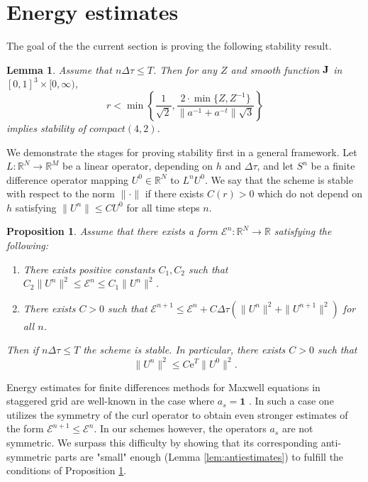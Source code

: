 \documentclass[12pt,reqno]{amsart}
\newcommand{\R}{\mathbb{R}}
\newcommand{\h}{{\bf H}}
\newcommand{\J}{{\bf J}}
\newtheorem{lemma}[theorem]{Lemma}
\newtheorem{proposition}[theorem]{Proposition}
\theoremstyle{definition}
\numberwithin{equation}{section}
\newcommand{\intr}[1]{\mathrm{int}(#1)}
\def\Gwh{\Omega_h}
\begin{document}
	


	

	\section{Energy estimates}
%
% 
%

 	The goal of the the current section is proving the following stability result.
 \begin{lemma}\label{lem:coer}
 	Assume that $n\Delta \tau\leq T$. Then
 	for any $Z$ and smooth function $\J$ in $[0,1]^3\times [0,\infty)$, 
 	$$
 	r<\min \left \{  \frac{1}{\sqrt{2}},\frac{2\cdot\min\{Z,Z^{-1}\}}
 	{\|a^{-1}+a^{-t}\|\sqrt{3}}  \right \}
 	$$
 	implies stability of $compact(4,2)$.
 \end{lemma}
 We demonstrate the stages for proving stability first in  a general framework.
 Let $L:\R^N\to \R^M$ be a linear operator, depending on $h$ and $\Delta \tau$, and let $S^n$ be a finite difference operator mapping $U^0\in \R^N$ to $L^nU^0$.
We say that the scheme is stable with respect to the norm $\|\cdot \|$ if  there exists $C(r)>0$ which do not depend on $h$ satisfying 
 $\|U^n\|\leq CU^0$ for all time steps $n$.
 \begin{proposition}\cite[section 5]{GKO}\label{prop:p1}
 	Assume that there exists a form $\mathcal{E}^n:\R^N\to \R$ satisfying the following:
 	\begin{enumerate}
 		\item There exists positive constants $C_1,C_2$ such that $C_2 \|U^n\|^2\leq \mathcal{E}^n\leq C_1 \|U^n\|^2$.
 		\item There exists $C>0$ such that $\mathcal{E}^{n+1}\leq \mathcal{E}^n+C\Delta \tau(\|U^n\|^2+\|U^{n+1}\|^2)$ for all $n$.
 	\end{enumerate}
 Then  if $n\Delta \tau\leq T$ the scheme is stable. In particular,  there exists $C>0$ such that
 $$
 \|U^n\|^2\leq C\mathrm{e}^T\|U^0\|^2.
 $$
 \end{proposition}
Energy estimates for finite differences methods for Maxwell  equations in staggered grid are well-known in the case where $a_s=\mathbf{1}$ \cite{sakka}.
 In such a case one utilizes the symmetry of the curl operator to obtain even stronger estimates of the form  $\mathcal{E}^{n+1}\leq \mathcal{E}^n$. 
In our schemes however, the operators $a_s$ are not symmetric. We surpass this difficulty by showing that its corresponding  anti-symmetric parts are "small" enough (Lemma \ref{lem:antiestimates}) to fulfill the conditions of Proposition \ref{prop:p1}.
 
\end{document}
